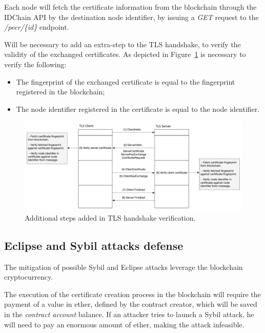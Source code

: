 {Each node will fetch the certificate information from the blockchain through the IDChain API by the destination node identifier, by issuing a \textit{GET} request to the \textit{/peer/\{id\}} endpoint.

Will be necessary to add an extra-step to the TLS handshake, to verify the validity of the exchanged certificates.
As depicted in Figure~\ref{fig:tls-handshake-plus} is necessary to verify the following:

\begin{itemize}
  \item The fingerprint of the exchanged certificate is equal to the fingerprint registered in the blockchain;
  \item The node identifier registered in the certificate is equal to the node identifier.
\end{itemize}

\begin{figure}[htb]
  \includegraphics[width=\linewidth]{Figures/tls-handshake-plus.pdf}
  \caption{Additional steps added in TLS handshake verification.}
\label{fig:tls-handshake-plus}
\end{figure}


\subsection{Eclipse and Sybil attacks defense}
The mitigation of possible Sybil and Eclipse attacks leverage the blockchain cryptocurrency.

The execution of the certificate creation process in the blockchain will require the payment of a value in ether, defined by the contract creator, which will be saved in the \textit{contract account} balance.
If an attacker tries to launch a Sybil attack, he will need to pay an enormous amount of ether, making the attack infeasible.

}
